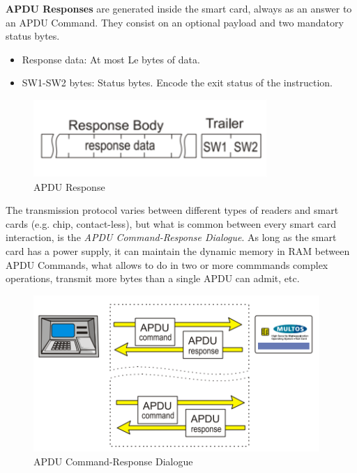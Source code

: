 \textbf{APDU Responses} are generated inside the smart card, always as an answer to an APDU Command. They consist on an optional payload and two mandatory status bytes.


\begin{itemize}
	\item Response data: At most Le bytes of data.
	\item SW1-SW2 bytes: Status bytes. Encode the exit status of the instruction.
\end{itemize}

\begin{figure}[bth]
	\begin{center}
		\includegraphics[width=0.55\linewidth]{gfx/APDUResponse}
	\end{center}
	\caption{APDU Response}
	\label{fig:APDUResponse}
\end{figure}




\hfil


The transmission protocol varies between different types of readers and smart cards (e.g. chip, contact-less), but what is common between every smart card interaction, is the \textit{APDU Command-Response Dialogue}. As long as the smart card has a power supply, it can maintain the dynamic memory in RAM between APDU Commands, what allows to do in two or more commmands complex operations, transmit more bytes than a single APDU can admit, etc.

\hfil




\begin{figure}[bth]
	\begin{center}
		\includegraphics[width=0.75\linewidth]{gfx/APDUdialog}
	\end{center}
	\caption{APDU Command-Response Dialogue}
	\label{fig:APDUdialog}
\end{figure}

